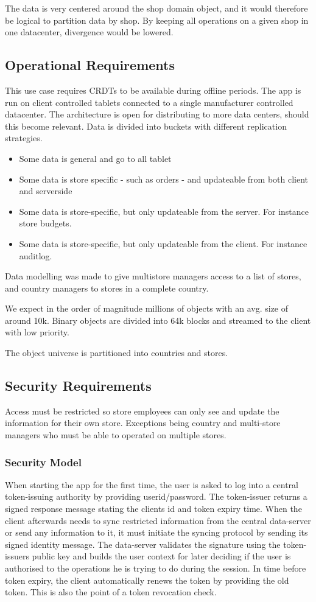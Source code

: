 \documentclass[11pt,a4paper]{report}
\begin{document}
The data is very centered around the shop domain object, and it would therefore be logical to partition data by shop. By keeping all operations on a given shop in one datacenter, divergence would be lowered.

\subsection{Operational Requirements}
This use case requires CRDTs to be available during offline periods.
The app is run on client controlled tablets connected to a single manufacturer controlled datacenter. The architecture is open for distributing to more data centers, should this become relevant.
Data is divided into buckets with different replication strategies. 
\begin{itemize}
\item Some data is general and go to all tablet
\item Some data is store specific - such as orders - and updateable from both client and serverside
\item Some data is store-specific, but only updateable from the server. For instance store budgets.
\item Some data is store-specific, but only updateable from the client. For instance auditlog.
\end{itemize}

Data modelling was made to give multistore managers access to a list of stores, and country managers to stores in a complete country.

We expect in the order of magnitude millions of objects with an avg. size of around 10k. Binary objects are divided into 64k blocks and streamed to the client with low priority.

The object universe is partitioned  into countries and stores.

\subsection{Security Requirements}
Access must be restricted so store employees can only see and update the information for their own store. Exceptions being country and multi-store managers who must be able to operated on multiple stores.

\subsubsection{Security Model}
When starting the app for the first time, the user is asked to log into a central token-issuing authority by providing userid/password. The token-issuer returns a signed response message stating the clients id and token expiry time.
When the client afterwards needs to sync restricted information from the central data-server or send any information to it, it must initiate the syncing protocol by sending its signed identity message. The data-server validates the signature using the token-issuers public key and builds the user context for later deciding if the user is authorised to the operations he is trying to do during the session.
In time before token expiry, the client automatically renews the token by providing the old token. This is also the point of a token revocation check.
\end{document}
